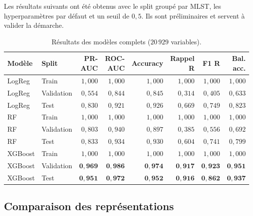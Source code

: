 \documentclass[11pt,a4paper]{article}
\begin{document}
Les résultats suivants ont été obtenus avec le split groupé par MLST, les hyperparamètres par défaut et un seuil de $0{,}5$. Ils sont préliminaires et servent à valider la démarche.

\begin{table}[H]
\centering
\caption{Résultats des modèles complets ($20\,929$ variables).}
\label{tab:results_full}
\small
\begin{tabular}{llrrrrrr}
\toprule
\textbf{Modèle} & \textbf{Split} & \textbf{PR-AUC} & \textbf{ROC-AUC} & \textbf{Accuracy} & \textbf{Rappel R} & \textbf{F1 R} & \textbf{Bal. acc.} \\
\midrule
LogReg & Train & $1{,}000$ & $1{,}000$ & $1{,}000$ & $1{,}000$ & $1{,}000$ & $1{,}000$ \\
LogReg & Validation & $0{,}554$ & $0{,}844$ & $0{,}845$ & $0{,}314$ & $0{,}405$ & $0{,}633$ \\
LogReg & Test & $0{,}830$ & $0{,}921$ & $0{,}926$ & $0{,}669$ & $0{,}749$ & $0{,}823$ \\
\midrule
RF & Train & $1{,}000$ & $1{,}000$ & $1{,}000$ & $1{,}000$ & $1{,}000$ & $1{,}000$ \\
RF & Validation & $0{,}803$ & $0{,}940$ & $0{,}897$ & $0{,}385$ & $0{,}556$ & $0{,}692$ \\
RF & Test & $0{,}833$ & $0{,}934$ & $0{,}930$ & $0{,}604$ & $0{,}741$ & $0{,}799$ \\
\midrule
XGBoost & Train & $1{,}000$ & $1{,}000$ & $1{,}000$ & $1{,}000$ & $1{,}000$ & $1{,}000$ \\
XGBoost & Validation & $\mathbf{0{,}969}$ & $\mathbf{0{,}986}$ & $\mathbf{0{,}974}$ & $\mathbf{0{,}917}$ & $\mathbf{0{,}923}$ & $\mathbf{0{,}951}$ \\
XGBoost & Test & $\mathbf{0{,}951}$ & $\mathbf{0{,}972}$ & $\mathbf{0{,}952}$ & $\mathbf{0{,}916}$ & $\mathbf{0{,}862}$ & $\mathbf{0{,}937}$ \\
\bottomrule
\end{tabular}
\end{table}

\subsection{Comparaison des représentations}
\end{document}
